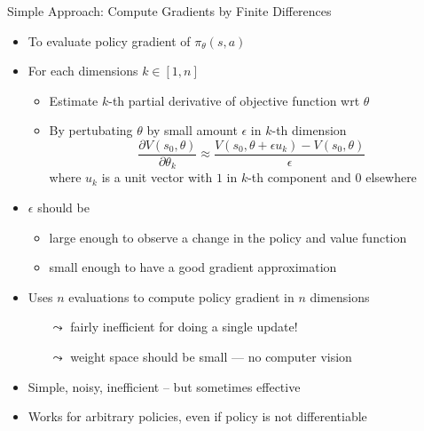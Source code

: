 \begin{frame}[c]{Simple Approach: Compute Gradients by Finite Differences}
	
	\begin{itemize}
		\item To evaluate policy gradient of $\pi_\theta(s,a)$
		\item For each dimensions $k\in [1,n]$
		\begin{itemize}
			\item Estimate $k$-th partial derivative of objective function wrt $\theta$
			\item By pertubating $\theta$ by small amount $\epsilon$ in $k$-th dimension
			$$\frac{\partial V(s_0, \theta)}{\partial \theta_k} \approx \frac{V(s_0, \theta + \epsilon u_k) - V(s_0, \theta)}{\epsilon} $$
			where $u_k$ is a unit vector with $1$ in $k$-th component and $0$ elsewhere
		\end{itemize}
		\pause
		\item $\epsilon$ should be
		\begin{itemize}
			\item large enough to observe a change in the policy and value function
			\item small enough to have a good gradient approximation
		\end{itemize}
		\pause
		\item Uses $n$ evaluations to compute policy gradient in $n$ dimensions
		\begin{itemize}
			\item[$\leadsto$] fairly inefficient for doing a single update!
			\item[$\leadsto$] weight space should be small --- no computer vision
		\end{itemize}
		\pause
		\item Simple, noisy, inefficient -- but sometimes effective
		\item Works for arbitrary policies, even if policy is not differentiable
	\end{itemize}
	
\end{frame}

